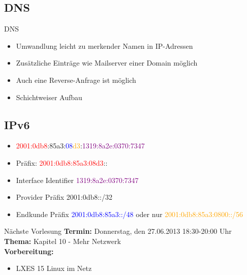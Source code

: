 \documentclass[aspectratio=43]{beamer}
\begin{document}
\subsection{DNS}
\begin{frame} 

	\begin{block}{DNS}
	\begin{itemize}
	\item Umwandlung leicht zu merkender Namen in IP-Adressen
	\item Zusätzliche Einträge wie Mailserver einer Domain möglich
	\item Auch eine Reverse-Anfrage ist möglich
	\item Schichtweiser Aufbau
	\end{itemize}
	\end{block}
	
\end{frame}

\subsection{IPv6}
\begin{frame} 
	\begin{block}{} 
	\begin{itemize}
	\item \textcolor{red}{2001:0db8}:\textcolor{green!50!black}{85a3}:\textcolor{blue}{08}\textcolor{orange}{d3}:\textcolor{purple}{1319:8a2e:0370:7347}
	\item Präfix: \textcolor{red}{2001:0db8:85a3:08d3}::
	\item Interface Identifier \textcolor{purple}{1319:8a2e:0370:7347}
	\item Provider Präfix \textcolor{green!50!black}{2001:0db8::/32}
	\item Endkunde Präfix    \textcolor{blue}{2001:0db8:85a3::/48} oder nur \textcolor{orange}{2001:0db8:85a3:0800::/56} 
	\end{itemize}
	\end{block}
\end{frame}


\begin{frame}[plain]
\begin{alertblock}{Nächste Vorlesung}
\textbf{Termin:} Donnerstag, den 27.06.2013 18:30-20:00 Uhr\\
\textbf{Thema:} Kapitel 10 - Mehr Netzwerk \\
\textbf{Vorbereitung:} 
\begin{itemize}
\item LXES 15 Linux im Netz 
\end{itemize}
\end{alertblock}
\end{frame}

\materialframe
\end{document}
